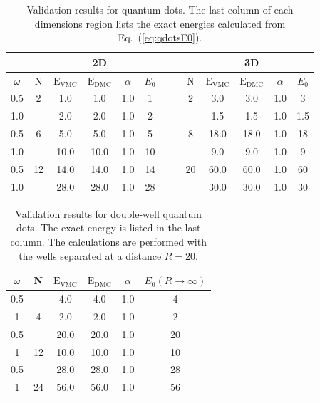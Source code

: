 \setlength{\tabcolsep}{0.3cm}
\begin{table}[h]
\begin{center}
\begin{tabular}{c|cccccc||cccccc}
 & & & 2D & & & & & & & 3D \\
\hline
  $\omega$   & N & $\mathrm{E_{VMC}}$ & $\mathrm{E_{DMC}}$ & $\alpha$ & $E_0$ & \qquad  & \qquad &  N   & $\mathrm{E_{VMC}}$ & $\mathrm{E_{DMC}}$ & $\alpha$ & $E_0$ \\
\hline
 0.5 &   2   &   1.0    &   1.0    &   1.0    & 1  & \qquad & \qquad & 2     &   3.0   &   3.0    &   1.0    & 3 \\
 1.0 &       &   2.0    &   2.0    &   1.0    & 2  & \qquad & \qquad &       &   1.5   &   1.5    &   1.0    & 1.5 \\
 0.5 &   6   &   5.0    &   5.0    &   1.0    & 5  & \qquad & \qquad &  8    &   18.0  &   18.0   &   1.0    & 18 \\
 1.0 &       &   10.0   &   10.0   &   1.0    & 10 & \qquad & \qquad &       &  9.0    &   9.0    &   1.0    & 9 \\
 0.5 &   12  &   14.0   &   14.0   &   1.0    & 14 & \qquad & \qquad & 20    &  60.0   &   60.0   &   1.0    & 60 \\
 1.0 &       &   28.0   &   28.0   &   1.0    & 28 & \qquad & \qquad &       &  30.0   &   30.0   &   1.0    & 30 \\
\end{tabular}
\caption{Validation results for quantum dots. The last column of each dimensions region lists the exact energies calculated from Eq.~(\ref{eq:qdotsE0}). }
\label{tab:res_valid_qdots}
\end{center}
\end{table}
\setlength{\tabcolsep}{6pt}

\setlength{\tabcolsep}{0.7cm}
\begin{table}[h]
\begin{center}
\begin{tabular}{cc|cccc}
  $\omega$   & N & $\mathrm{E_{VMC}}$ & $\mathrm{E_{DMC}}$ & $\alpha$ & $E_0(R\to\infty)$ \\
\hline
  0.5  &       &   4.0   & 4.0   &   1.0    & 4   \\
  1    &   4   &   2.0   & 2.0   &   1.0    & 2   \\
  0.5  &       &   20.0  & 20.0  &   1.0    & 20  \\
  1    &   12  &   10.0  & 10.0  &   1.0    & 10  \\
  0.5  &       &   28.0  & 28.0  &   1.0    & 28   \\
  1    &   24  &   56.0  & 56.0  &   1.0    & 56   \\
\end{tabular}
\caption{Validation results for double-well quantum dots. The exact energy is listed in the last column. The calculations are performed with the wells separated at a distance $R=20$.}
\label{tab:res_valid_qdots_doublewell}
\end{center}
\end{table}
\setlength{\tabcolsep}{6pt}


